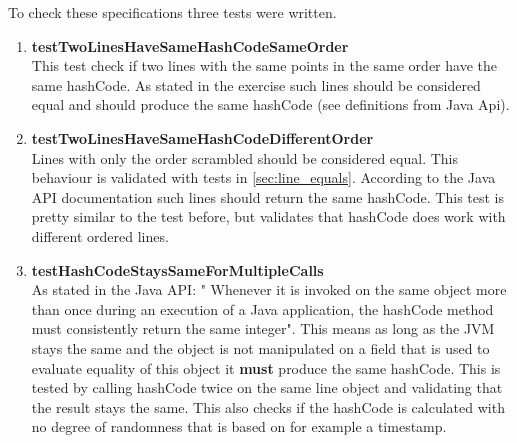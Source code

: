 To check these specifications three tests were written.
\begin{enumerate}
    \item \textbf{testTwoLinesHaveSameHashCodeSameOrder} \\
    This test check if two lines with the same points in the same order have the same hashCode. As stated in the exercise such lines should be considered equal and should produce the same hashCode (see definitions from Java Api).
    \item \textbf{testTwoLinesHaveSameHashCodeDifferentOrder} \\
    Lines with only the order scrambled should be considered equal. This behaviour is validated with tests in \ref{sec:line_equals}. According to the Java API documentation such lines should return the same hashCode. This test is pretty similar to the test before, but validates that hashCode does work with different ordered lines.
    \item \textbf{testHashCodeStaysSameForMultipleCalls} \\
    As stated in the Java API: " Whenever it is invoked on the same object more than once during an execution of a Java application, the hashCode method must consistently return the same integer". This means as long as the JVM stays the same and the object is not manipulated on a field that is used to evaluate equality of this object it \textbf{must} produce the same hashCode. This is tested by calling hashCode twice on the same line object and validating that the result stays the same. This also checks if the hashCode is calculated with no degree of randomness that is based on for example a timestamp.
\end{enumerate}

